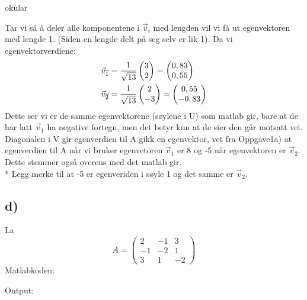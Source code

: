 okular\documentclass[a4paper, norsk, twoside, 10pt]{article}
\begin{document}
Tar vi så å deler alle komponentene i $\vec{v}_{i}$ med lengden vil vi få ut egenvektoren med lengde 1. (Siden en lengde delt på seg selv er lik 1). Da vi egenvektorverdiene:
\[\begin{split}
\vec{v}_{\overline{1}} &= \frac{1}{\sqrt{13}}\begin{pmatrix} 3 \\ 2 \end{pmatrix} =
  \begin{pmatrix}
    0,83\\
    0,55
  \end{pmatrix} \\*
\vec{v}_{\overline{2}} &= \frac{1}{\sqrt{13}}\begin{pmatrix} 2\\ -3 \end{pmatrix} =
  \begin{pmatrix}
    0,55\\
    -0,83
  \end{pmatrix}
\end{split}\]
Dette ser vi er de samme egenvektorene (søylene i U) som matlab gir, bare at de har latt $\vec{v}_{1}$ ha negative fortegn, men det betyr kun at de sier den går motsatt vei.
Diagonalen i V gir egenverdien til A gikk en egenvektor, vet fra Oppgave1a) at egenverdien til A når vi bruker egenvetoren $\vec{v}_{1}$ er 8 og -5 når egenvektoren er $\vec{v}_{2}$. Dette stemmer også overens med det matlab gir. \\*
Legg merke til at -5 er egenveriden i søyle 1 og det samme er $\vec{v}_{2}$.





\subsection*{d)}
\def\matriseAD{
  \begin{pmatrix}
    2 & -1 & 3 \\
    -1 & -2 & 1 \\
    3 & 1 & -2
  \end{pmatrix}
}
La \[A = \matriseAD\]
Matlabkoden:

Output:

\end{document}
